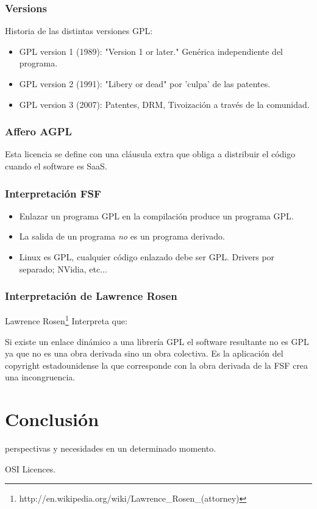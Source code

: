 \documentclass[11pt]{scrartcl}
\begin{document}
\subsubsection{Versions}

Historia de las distintas versiones GPL:
\begin{itemize}
	\item GPL version 1 (1989): "Version 1 or later." Gen\'erica independiente del programa.
	\item GPL version 2 (1991): "Libery or dead" por 'culpa' de las patentes.
	\item GPL version 3 (2007): Patentes, DRM, Tivoizaci\'on a trav\'es de la comunidad.
\end{itemize}

\subsubsection{Affero AGPL}

Esta licencia se define con una cl\'ausula extra que obliga a distribuir el c\'odigo cuando el software es SaaS.

\subsubsection{Interpretaci\'on FSF}

\begin{itemize}
	\item Enlazar un programa GPL en la compilaci\'on produce un programa GPL.
	\item La salida de un programa \emph{no} es un programa derivado.
	\item Linux es GPL, cualquier c\'odigo enlazado debe ser GPL. Drivers por separado; NVidia, etc...
\end{itemize}

\subsubsection{Interpretaci\'on de Lawrence Rosen}

Lawrence Rosen\footnote{http://en.wikipedia.org/wiki/Lawrence\_Rosen\_(attorney)} Interpreta que:

Si existe un enlace din\'amico a una librer\'ia GPL el software resultante no es GPL ya que no es una obra derivada sino un obra colectiva.
Es la aplicaci\'on del copyright estadounidense la que corresponde con la obra derivada de la FSF crea una incongruencia.

\section{Conclusi\'on}

perspectivas y necesidades en un determinado momento.

\begin{thebibliography}{9}

  OSI Licences.

\end{thebibliography}
\end{document}

